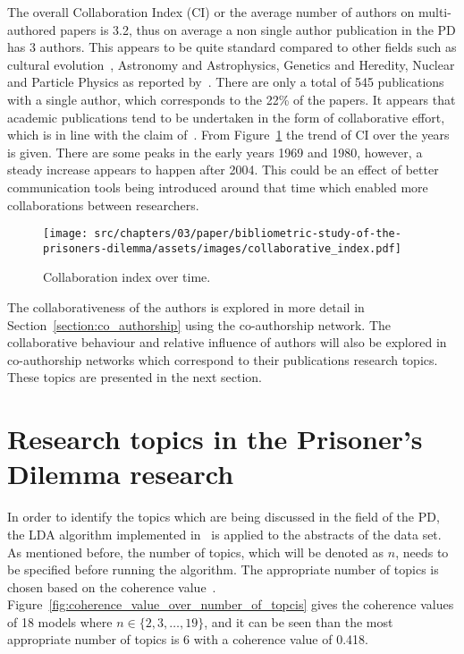 The overall Collaboration Index (CI) or the average number of authors on
multi-authored papers is 3.2, thus on average a non single author publication in
the PD has 3 authors. This appears to be quite standard compared to other fields
such as cultural evolution~\cite{youngblood2018}, Astronomy and Astrophysics,
Genetics and Heredity, Nuclear and Particle Physics as reported
by~\cite{nature_author_blog}.
There are only a total of 545 publications with a single author, which
corresponds to the 22\% of the papers. It appears that academic publications
tend to be undertaken in the form of collaborative effort, which is in line
with the claim of~\cite{Kyvik2017}. From
Figure~\ref{fig:ci_over_time} the trend of CI over the years is given. There are
some peaks in the early years 1969 and 1980, however, a steady increase appears
to happen after 2004. This could be an effect of better communication tools
being introduced around that time which enabled more collaborations between
researchers.

\begin{figure}[!hbtp]
    \centering
    \texttt{[image: src/chapters/03/paper/bibliometric-study-of-the-prisoners-dilemma/assets/images/collaborative\_index.pdf]}
    \caption{Collaboration index over time.}\label{fig:ci_over_time}
\end{figure}

The collaborativeness of the authors is explored in more detail in
Section~\ref{section:co_authorship} using the co-authorship network. The
collaborative behaviour and relative influence of authors will also be explored
in co-authorship networks which correspond to their publications research topics.
These topics are presented in the next section.

\section{Research topics in the Prisoner's Dilemma research}\label{section:topics}

In order to identify the topics which are being discussed in the field of the
PD, the LDA algorithm implemented in~\cite{rehurek_lrec} is applied to the
abstracts of the data set. As mentioned before, the number of topics, which
will be denoted as \(n\), needs to be specified before running the algorithm.
The appropriate number of topics is chosen based on the coherence
value~\cite{Roder2015}. Figure~\ref{fig:coherence_value_over_number_of_topcis}
gives the coherence values of 18 models where \(n \in \{2, 3, \dots, 19\}\), and
it can be seen than the most appropriate number of topics is 6 with a coherence
value of 0.418.

